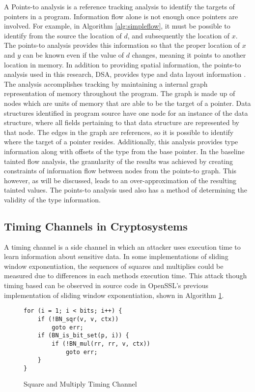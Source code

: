 A Points-to analysis is a reference tracking analysis to identify the targets of
pointers in a program. Information flow alone is not enough once pointers are
involved. For example, in Algorithm \ref{alg:simpleflow}, it must be possible to
identify from the source the location of $d$, and subsequently the location of
$x$. The points-to analysis provides this information so that the proper
location of $x$ and $y$ can be known even if the value of $d$ changes, meaning
it points to another location in memory. In addition to providing spatial
information, the points-to analysis used in this research, DSA,  provides type and data
layout information \cite{DSA-lattner}. The analysis accomplishes tracking by maintaining a internal
graph representation of memory throughout the program. The graph is made up of
nodes which are units of memory that are able to be the target of a pointer.
Data structures identified in program source have one node for an instance of
the data structure, where all fields pertaining to that data structure are
represented by that node. The edges in the graph are references, so it is
possible to identify where the target of a pointer resides. Additionally, this
analysis provides type information along with offsets of the type from the base
pointer. In the baseline tainted flow analysis, the granularity of the results
was achieved by creating  constraints of information flow between nodes from the
points-to graph. This however, as will be discussed, leads to an
over-approximation of the resulting tainted values. The points-to analysis used
also has a method of determining the validity of the type information. 

\subsection{Timing Channels in Cryptosystems}

A timing channel is a side channel in which an attacker uses execution time to
learn information about sensitive data. In some implementations of sliding
window exponentiation, the sequences of squares and multiplies could be measured
due to differences in each methods execution time. This attack though timing
based can be observed in source code in OpenSSL's previous implementation of
sliding window exponentiation, shown in Algorithm \ref{alg:timingsqrmlt}. 

\begin{figure}
\begin{lstlisting}
for (i = 1; i < bits; i++) {
    if (!BN_sqr(v, v, ctx))
        goto err;
    if (BN_is_bit_set(p, i)) {
        if (!BN_mul(rr, rr, v, ctx))
            goto err;
    }
}
\end{lstlisting}
\caption{Square and Multiply Timing Channel}
\label{alg:timingsqrmlt}
\end{figure}

